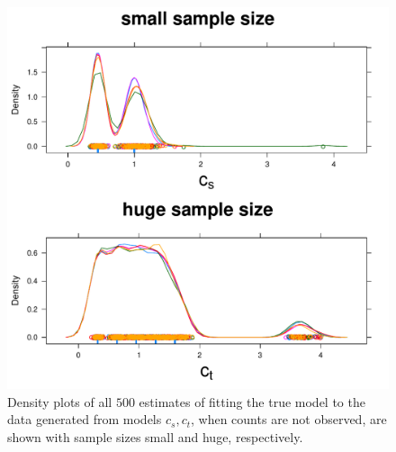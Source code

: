 


\begin{figure}
  \centering
  \includegraphics[scale=0.5]{em}
  \caption{Density plots of all $500$ estimates of fitting the true model to the data generated from models $c_s,c_t$, when counts are not observed, are shown with sample sizes small and huge, respectively.}
  \label{fig:em}
\end{figure}

